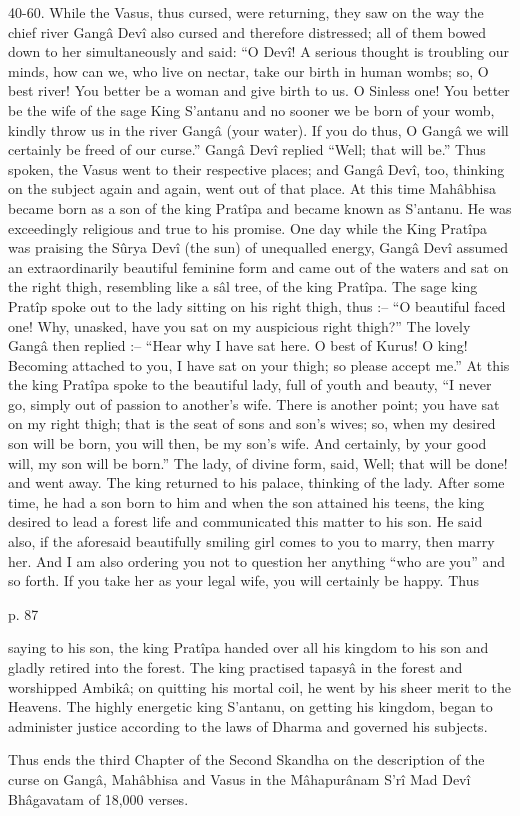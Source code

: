 40-60. While the Vasus, thus cursed, were returning, they saw on the way the chief river Gangâ Devî also cursed and therefore distressed; all of them bowed down to her simultaneously and said: “O Devî! A serious thought is troubling our minds, how can we, who live on nectar, take our birth in human wombs; so, O best river! You better be a woman and give birth to us. O Sinless one! You better be the wife of the sage King S’antanu and no sooner we be born of your womb, kindly throw us in the river Gangâ (your water). If you do thus, O Gangâ we will certainly be freed of our curse.” Gangâ Devî replied “Well; that will be.” Thus spoken, the Vasus went to their respective places; and Gangâ Devî, too, thinking on the subject again and again, went out of that place. At this time Mahâbhisa became born as a son of the king Pratîpa and became known as S’antanu. He was exceedingly religious and true to his promise. One day while the King Pratîpa was praising the Sûrya Devî (the sun) of unequalled energy, Gangâ Devî assumed an extraordinarily beautiful feminine form and came out of the waters and sat on the right thigh, resembling like a sâl tree, of the king Pratîpa. The sage king Pratîp spoke out to the lady sitting on his right thigh, thus :-- “O beautiful faced one! Why, unasked, have you sat on my auspicious right thigh?” The lovely Gangâ then replied :-- “Hear why I have sat here. O best of Kurus! O king! Becoming attached to you, I have sat on your thigh; so please accept me.” At this the king Pratîpa spoke to the beautiful lady, full of youth and beauty, “I never go, simply out of passion to another's wife. There is another point; you have sat on my right thigh; that is the seat of sons and son's wives; so, when my desired son will be born, you will then, be my son's wife. And certainly, by your good will, my son will be born.” The lady, of divine form, said, Well; that will be done! and went away. The king returned to his palace, thinking of the lady. After some time, he had a son born to him and when the son attained his teens, the king desired to lead a forest life and communicated this matter to his son. He said also, if the aforesaid beautifully smiling girl comes to you to marry, then marry her. And I am also ordering you not to question her anything “who are you” and so forth. If you take her as your legal wife, you will certainly be happy. Thus

 

p. 87

 

saying to his son, the king Pratîpa handed over all his kingdom to his son and gladly retired into the forest. The king practised tapasyâ in the forest and worshipped Ambikâ; on quitting his mortal coil, he went by his sheer merit to the Heavens. The highly energetic king S’antanu, on getting his kingdom, began to administer justice according to the laws of Dharma and governed his subjects.

 

Thus ends the third Chapter of the Second Skandha on the description of the curse on Gangâ, Mahâbhisa and Vasus in the Mâhapurânam S’rî Mad Devî Bhâgavatam of 18,000 verses.